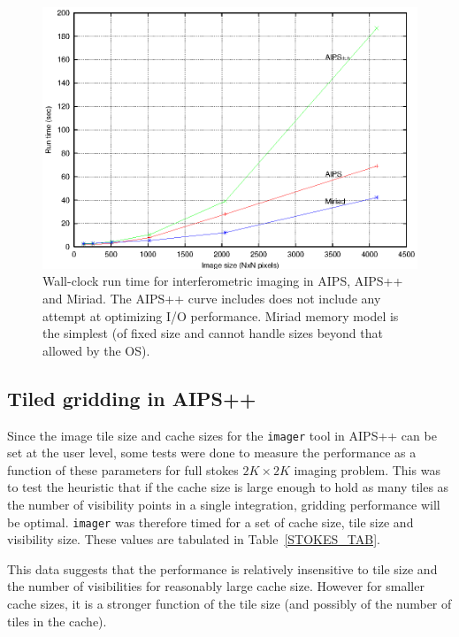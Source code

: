 \begin{figure}[t!]
\begin{center}
  \includegraphics{mir_aips_aips++.imaging.eps}
\caption[Imaging run time comparison between AIPS, MIRIAD and
AIPS++]{\small Wall-clock run time for
interferometric imaging in AIPS, AIPS++ and Miriad.  The AIPS++ curve
includes does not include any attempt at optimizing I/O performance.
Miriad memory model is the simplest (of fixed size and cannot handle
sizes beyond that allowed by the OS).}
\label{MIR_AIPS_AIPS++}
\end{center}
\end{figure}



\subsection{Tiled gridding in AIPS++}

Since the image tile size and cache sizes for the {\tt imager} tool in
AIPS++ can be set at the user level, some tests were done to measure
the performance as a function of these parameters for full stokes
$2K\times 2K$ imaging problem.  This was to test the heuristic that if
the cache size is large enough to hold as many tiles as the number of
visibility points in a single integration, gridding performance will
be optimal.  {\tt imager} was therefore timed for a set of cache size,
tile size and visibility size.  These values are tabulated in
Table~\ref{STOKES_TAB}.

This data suggests that the performance is relatively insensitive to
tile size and the number of visibilities for reasonably large cache
size.  However for smaller cache sizes, it is a stronger function of
the tile size (and possibly of the number of tiles in the cache).

